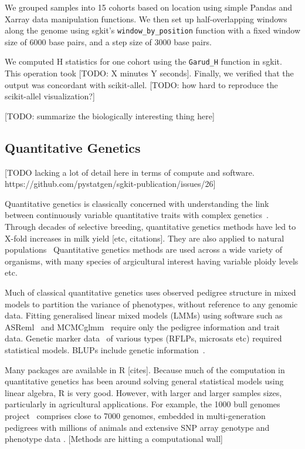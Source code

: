 \documentclass[9pt,lineno]{elife}
\newcommand{\sgapi}[1]{\texttt{#1}}
\begin{document}
We grouped samples into 15 cohorts based on location using simple Pandas and
Xarray data manipulation functions. We then set up half-overlapping windows
along the genome using sgkit's \sgapi{window\_by\_position} function with a fixed
window size of 6000 base pairs, and a step size of 3000 base pairs.

We computed H statistics for one cohort using the \sgapi{Garud\_H} function in sgkit.
This operation took [TODO: X minutes Y seconds]. Finally, we verified that the
output was concordant with scikit-allel. [TODO: how hard to reproduce the
scikit-allel visualization?]

[TODO: summarize the biologically interesting thing here]

\subsection{Quantitative Genetics}
[TODO lacking a lot of detail here in terms of compute and software.
https://github.com/pystatgen/sgkit-publication/issues/26]

Quantitative genetics is classically concerned with understanding
the link between continuously variable quantitative traits
with complex genetics~\citep{hill2010understanding}.
Through decades of selective breeding, quantitative genetics methods have
led to X-fold increases in milk yield [etc, citations].
They are also applied to
natural populations~\citep{wilson2010ecologist}
Quantitative genetics methods are used across a wide variety of
organisms, with many species of argicultural interest having
variable ploidy levels etc.

Much of classical quantitative genetics uses observed pedigree structure
in mixed models to partition the variance of phenotypes, without
reference to any genomic data.
Fitting generalised linear mixed models (LMMs) using
software such as ASReml~\citep{butler2009asreml}
and MCMCglmm~\citep{hadfield2010mcmc} require only the pedigree
information and trait data.
Genetic marker data~\citep{bernardo2008molecular} of various
types (RFLPs, microsats etc) required statistical models.
BLUPs include genetic information~\citep{endelman2011ridge}.

Many packages are available in R [cites]. Because much of the computation
in quantitative genetics has been around solving
general statistical models using linear algebra, R is very good.
However, with larger and larger samples sizes, particularly
in agricultural applications.
For example,
the 1000 bull genomes project~\citep{hayes20191000}
comprises close to 7000 genomes, embedded in multi-generation pedigrees
with millions of animals and extensive SNP array genotype and phenotype
data \citep[e.g.][]{cesarani2022mulibreed}.
[Methods are hitting a computational wall]
\end{document}
